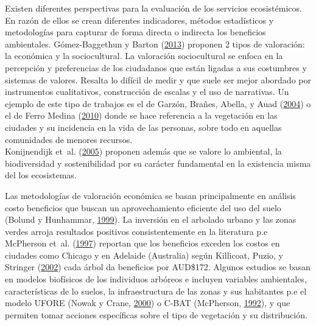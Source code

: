 \documentclass[12pt,a4paper,oneside, openany]{book}
\theoremstyle{definition}
\theoremstyle{definition}
\theoremstyle{definition}
\theoremstyle{remark}
\begin{document}
Existen diferentes perspectivas para la evaluación de los servicios
ecosistémicos. En razón de ellos se crean diferentes indicadores,
métodos estadísticos y metodologías para capturar de forma directa o
indirecta los beneficios ambientales. Gómez-Baggethun y Barton
(\protect\hyperlink{ref-gomez-baggethun_classifying_2013}{2013})
proponen 2 tipos de valoración: la económica y la sociocultural. La
valoración sociocultural se enfoca en la percepción y preferencias de
los ciudadanos que están ligadas a sus costumbres y sistemas de valores.
Resalta lo difícil de medir y que suele ser mejor abordado por
instrumentos cualitativos, construcción de escalas y el uso de
narrativas. Un ejemplo de este tipo de trabajos es el de Garzón, Brañes,
Abella, y Auad (\protect\hyperlink{ref-garzon2004vegetacion}{2004}) o el
de Ferro Medina
(\protect\hyperlink{ref-ferro_medina_arboles_2010}{2010}) donde se hace
referencia a la vegetación en las ciudades y su incidencia en la vida de
las personas, sobre todo en aquellas comunidades de menores recursos.\\
Konijnendijk et~al.
(\protect\hyperlink{ref-konijnendijk_arboles_2005}{2005}) proponen
además que se valore lo ambiental, la biodiversidad y sostenibilidad por
su carácter fundamental en la existencia misma del los ecosistemas.

Las metodologías de valoración económica se basan principalmente en
análisis costo beneficios que buscan un aprovechamiento eficiente del
uso del suelo (Bolund y Hunhammar,
\protect\hyperlink{ref-bolund_ecosystem_1999}{1999}). La inversión en el
arbolado urbano y las zonas verdes arroja resultados positivos
consistentemente en la literatura p.e McPherson et~al.
(\protect\hyperlink{ref-mcpherson_quantifying_1997}{1997}) reportan que
los beneficios exceden los costos en ciudades como Chicago y en Adelaide
(Australia) según Killicoat, Puzio, y Stringer
(\protect\hyperlink{ref-killicoat_economic_2002}{2002}) cada árbol da
beneficios por AUD\$172. Algunos estudios se basan en modelos biofísicos
de los individuos arbóreos e incluyen variables ambientales,
características de lo suelos, la infraestructura de las zonas y sus
habitantes p.e el modelo UFORE (Nowak y Crane,
\protect\hyperlink{ref-nowak_urban_2000}{2000}) o C-BAT (McPherson,
\protect\hyperlink{ref-mcpherson1992accounting}{1992}), y que permiten
tomar acciones específicas sobre el tipo de vegetación y su
distribución.
\end{document}
